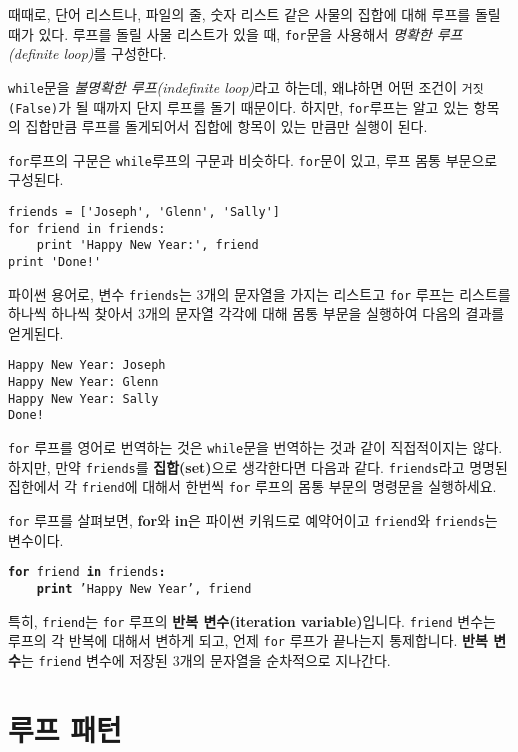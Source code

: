 때때로, 단어 리스트나, 파일의 줄, 숫자 리스트 같은 사물의 집합에 대해 루프를 돌릴 때가 있다.
루프를 돌릴 사물 리스트가 있을 때, {\tt for}문을 사용해서 \emph{명확한 루프(definite loop)}를 구성한다.

{\tt while}문을 \emph{불명확한 루프(indefinite loop)}라고 하는데, 왜냐하면 어떤 조건이 {\tt 거짓(False)}가 될 때까지 
단지 루프를 돌기 때문이다. 하지만,  {\tt for}루프는 알고 있는 항목의 집합만큼 루프를 돌게되어서 집합에 항목이 있는 만큼만 실행이 된다.

{\tt for}루프의 구문은 {\tt while}루프의 구문과 비슷하다. {\tt for}문이 있고, 루프 몸통 부문으로 구성된다.

\beforeverb
\begin{verbatim}
friends = ['Joseph', 'Glenn', 'Sally']
for friend in friends:
    print 'Happy New Year:', friend
print 'Done!'
\end{verbatim}
\afterverb
%

파이썬 용어로, 변수 {\tt friends}는 3개의 문자열을 가지는 리스트고 {\tt for} 루프는 리스트를 하나씩 하나씩 찾아서 3개의 문자열 각각에 대해 몸통 부문을 실행하여 
다음의 결과를 얻게된다.

\beforeverb
\begin{verbatim}
Happy New Year: Joseph
Happy New Year: Glenn
Happy New Year: Sally
Done!
\end{verbatim}
\afterverb
%

{\tt for} 루프를 영어로 번역하는 것은 {\tt while}문을 번역하는 것과 같이 직접적이지는 않다. 하지만, 만약 {\tt friends}를 {\bf 집합(set)}으로 생각한다면 다음과 같다.
{\tt friends}라고 명명된 집한에서 각 {\tt friend}에 대해서 한번씩 {\tt for} 루프의 몸통 부문의 명령문을 실행하세요.

{\tt for} 루프를 살펴보면, {\bf for}와 {\bf in}은 파이썬 키워드로 예약어이고 {\tt friend}와 {\tt friends}는 변수이다.

{\tt {\bf for} friend {\bf in} friends{\bf :}\\
\verb"    "{\bf print} 'Happy New Year', friend }

특히, {\tt friend}는 {\tt for} 루프의 {\bf 반복 변수(iteration variable)}입니다. 
{\tt friend} 변수는 루프의 각 반복에 대해서 변하게 되고, 언제 {\tt for} 루프가 끝나는지 통제합니다.
{\bf 반복 변수}는 {\tt friend} 변수에 저장된 3개의 문자열을 순차적으로 지나간다.



\section{루프 패턴}

